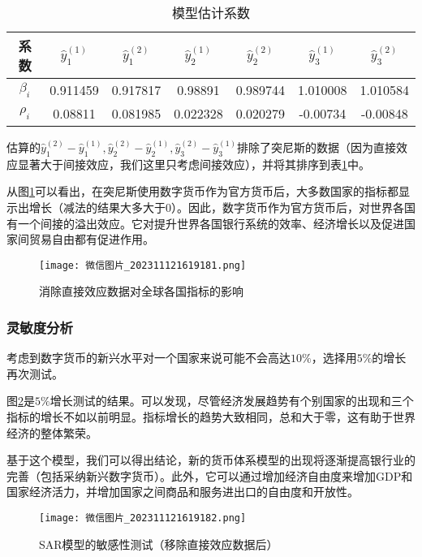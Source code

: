 \documentclass[withoutpreface,bwprint]{cumcmthesis} %
\begin{document}
\begin{table}[h]
	\centering
	\caption{模型估计系数}
	\label{tab8}
	\begin{tabular}{c|cccccc}
		\toprule[1.5pt]
		系数 & \(\hat{y}^{(1)}_1\) & \(\hat{y}^{(2)}_1\) & \(\hat{y}^{(1)}_2\) & \(\hat{y}^{(2)}_2\) & \(\hat{y}^{(1)}_3\) & \(\hat{y}^{(2)}_3\) \\ \midrule[1pt]
		\(\beta_i\) & 0.911459 & 0.917817 & 0.98891 & 0.989744 & 1.010008 & 1.010584 \\
		\(\rho_i\) & 0.08811 & 0.081985 & 0.022328 & 0.020279 & -0.00734 & -0.00848 \\
		\bottomrule[1.5pt]
	\end{tabular}
\end{table}

估算的$\hat{y}_1^{(2)}-\hat{y}_1^{(1)}, \hat{y}_2^{(2)}-\hat{y}_2^{(1)}, \hat{y}_3^{(2)}-\hat{y}_3^{(1)}$排除了突尼斯的数据（因为直接效应显著大于间接效应，我们这里只考虑间接效应），并将其排序到表\ref{tab8}中。

从图\ref{pic5}可以看出，在突尼斯使用数字货币作为官方货币后，大多数国家的指标都显示出增长（减法的结果大多大于0）。因此，数字货币作为官方货币后，对世界各国有一个间接的溢出效应。它对提升世界各国银行系统的效率、经济增长以及促进国家间贸易自由都有促进作用。

\begin{figure}[htbp]  %
	\centering  %
	\label{pic5}
	\texttt{[image: 微信图片\_202311121619181.png]} %
	\caption{消除直接效应数据对全球各国指标的影响} %
\end{figure}

\subsubsection{灵敏度分析}
考虑到数字货币的新兴水平对一个国家来说可能不会高达$10\%$，选择用$5\%$的增长再次测试。

图\ref{pic6}是$5\%$增长测试的结果。可以发现，尽管经济发展趋势有个别国家的出现和三个指标的增长不如以前明显。指标增长的趋势大致相同，总和大于零，这有助于世界经济的整体繁荣。

基于这个模型，我们可以得出结论，新的货币体系模型的出现将逐渐提高银行业的完善（包括采纳新兴数字货币）。此外，它可以通过增加经济自由度来增加GDP和国家经济活力，并增加国家之间商品和服务进出口的自由度和开放性。

\begin{figure}[htbp]  %
	\centering  %
	\label{pic6}
	\texttt{[image: 微信图片\_202311121619182.png]} %
	\caption{SAR模型的敏感性测试（移除直接效应数据后）} %
\end{figure}
\end{document}
